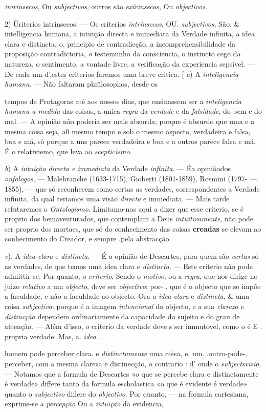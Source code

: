 \emph{inirinsecos}, Ou \emph{subjectivos}, outros são \emph{exírinsecos}, Ou \emph{objectivos}.\par 2) Üriterios intrinsecos. --- Os criterios \emph{intrínsecos}, OU. \emph{subjectivos}, São: \& intelligencia humana, a intuição directa e immediata da Verdade infinita, a idea clara e distincta, o. principio de contradicção, a incomprehensibilidade da proposição contradictoria, \emph{o} testemunho da consciencia, o instincto cego da natureza, o sentimento, a vontade livre, a verificação da experiencia sepsivel. --- De cada um d'.estes criterios faremos uma breve critica. [\textbar{} \emph{a}) A \emph{inteligencia humana}. --- Não faltaram phiülosophos, desde os\par tempos de Protagoras até aos nossos dias, que ensinassem ser a \emph{inteligencia humana a medida} das coisas, a unica \emph{regra} da \emph{verdade} e da \emph{falsidade}, do bem e do mal. --- A opinião não poderia ser mais absurda; porque é absurdo que uma e a mesma coisa seja, a0 mesmo tempo e sob o mesmo aspecto, verdadeira e falsa, boa e má, só porque a uns parece verdadeira e boa e a outros parece falsa e má. É o relativiemo, que leva ao \emph{scepticismo}.\par \emph{b}) A \emph{intuição directa e immediata} da Verdade \emph{infinita}. --- Éa opiniãodos \emph{onfologos}, --- Malebranche (1633-1715), Gioberti (1801-1859), Rosmini (1797- --- 1855), --- que só reconhecem como certas as verdades, correspondentes a Verdade infinita, da qual teriamos uma visão \emph{directa} e immediata. --- Mais tarde refutaremos o \emph{Ontologismo}. Limitamo-nos aqui a dizer que esse criterio, se é proprio dos bemaventurados, que contemplam a Deus \emph{intuitivamente}, não pode ser proprio dos mortaes, que só do conhecimento das coisas \textbf{creadas} se elevam ao conhecimento do Creador, e sempre .pela abstracção.\par \emph{c}). A \emph{idea clara} e \emph{distincta}. --- É a opinião de Descartes, para quem são \emph{certas} só as verdades, de que temos uma idea clara e \emph{distincta}. --- Este criterio não pode admittir-se. Por quanto, o \emph{criterio}, Sendo o \emph{motivo}, ou a \emph{regra}, que nos dirige no juizo \emph{relativo} a um \emph{objecto}, deve ser \emph{objectivo}: por- . que é o objecto que se impõe a faculdade, e não a faculdade ao objecto. Ora a \emph{idea clara} e \emph{distincta}, \& uma coisa \emph{subjectiva}: porque é a imagem \emph{intencional} do objecto, e a sua \emph{clareza} e \emph{distincção} dependem ordinariamente da capacidade do sujeito e do grau de attenção. --- Além d'isso, o criterio da verdade deve s ser immutovel, como o é E . propria verdade. Mas, a. \emph{idea}.\par homem pode perceber clara. e \emph{distinctamente} uma coisa, e. um. .outro-pode-. perceber, com a mesma clareza e distinecção, o contrario : d' onde o \emph{subjectsvisio}. --- Notamos que a formula de Descartes «o que se percebe clara e distinctamente é verdade» differe tanto da formula escholastica «o que é evidente é verdade» quanto o \emph{subjectivo} diflere do \emph{objectivo}. Por quanto, --- na formula cartesiana, exprime-se a \emph{percepção} Ou a \emph{intuição} da evidencia, 